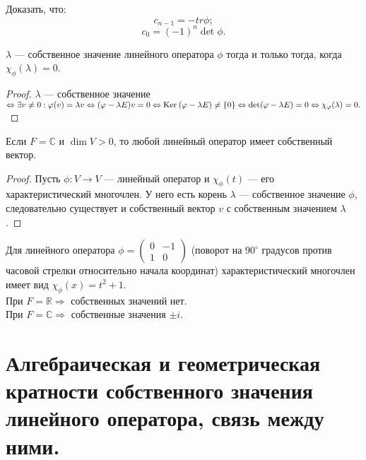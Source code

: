 \begin{Task}
Доказать, что:
	\[c_{n-1} = -tr\phi;\]
        \[c_0 = (-1)^n \det\phi.\]
\end{Task}

\begin{Suggestion}
	$\lambda$ --- собственное значение линейного оператора $\phi$ тогда и только тогда, когда $\chi_\phi(\lambda) = 0$. 
\end{Suggestion}

\begin{proof}
	$\lambda$ --- собственное значение $\Leftrightarrow \exists v \neq 0 : \varphi(v) = \lambda {v} \Leftrightarrow (\varphi - \lambda {E})v = 0 \Leftrightarrow \mathrm{Ker}\:(\varphi - \lambda {E}) \neq \{0\}
	\Leftrightarrow \det(\varphi - \lambda {E}) = 0 \Leftrightarrow \chi_\varphi(\lambda) = 0.$
\end{proof}

\begin{Suggestion}
	Если $F = \mathbb{C}$ и $\dim V > 0$, то любой линейный оператор имеет собственный вектор.
\end{Suggestion}

\begin{proof}
	Пусть $\phi: V \to V$ --- линейный оператор и $\chi_\phi(t)$ --- его характеристический многочлен. У него есть корень $\lambda$ --- собственное значение $\phi$, следовательно существует и собственный вектор $v$  с собственным значением $\lambda$.
\end{proof}

\begin{Examples}
	Для линейного оператора $\phi = \begin{pmatrix}
    0& -1 \\
    1& 0
    \end{pmatrix}$
    (поворот на $90^\circ$ градусов против часовой стрелки относительно начала координат) характеристический многочлен имеет вид $\chi_\phi(x) = t^2+1$.
    \\ При $F  = \mathbb{R} \Rightarrow$ собственных значений нет.
    \\ При $F = \mathbb{C} \Rightarrow$ собственные значения $\pm i$.
\end{Examples}

\section{Алгебраическая и геометрическая кратности собственного значения линейного оператора, связь между ними.}

